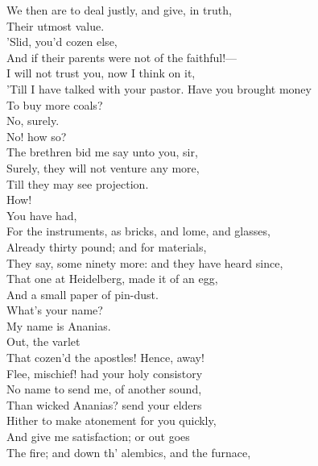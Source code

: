 \documentclass[a4paper,oneside]{memoir}
\begin{document}
\begin{drama*}
We then are to deal justly, and give, in truth,\\
Their utmost value.\\
\subtlespeaks {} 'Slid, you'd cozen else,\\
And if their parents were not of the faithful!---\\
I will not trust you, now I think on it,\\
'Till I have talked with your pastor. Have you brought money\\
To buy more coals?\\
\ananiasspeaks {} No, surely.\\
\subtlespeaks {} No! how so?\\
\ananiasspeaks The brethren bid me say unto you, sir,\\
Surely, they will not venture any more,\\
Till they may see projection.\\
\subtlespeaks {} How!\\
\ananiasspeaks {} You have had,\\
For the instruments, as bricks, and lome, and glasses,\\
Already thirty pound; and for materials,\\
They say, some ninety more: and they have heard since,\\
That one at Heidelberg, made it of an egg,\\
And a small paper of pin-dust.\\
\subtlespeaks {} What's your name?\\
\ananiasspeaks My name is Ananias.\\
\subtlespeaks {} Out, the varlet\\
That cozen'd the apostles! Hence, away!\\
Flee, mischief! had your holy consistory\\
No name to send me, of another sound,\\
Than wicked Ananias? send your elders\\
Hither to make atonement for you quickly,\\
And give me satisfaction; or out goes\\
The fire; and down th' alembics, and the furnace,\\

\end{drama*}
\end{document}
